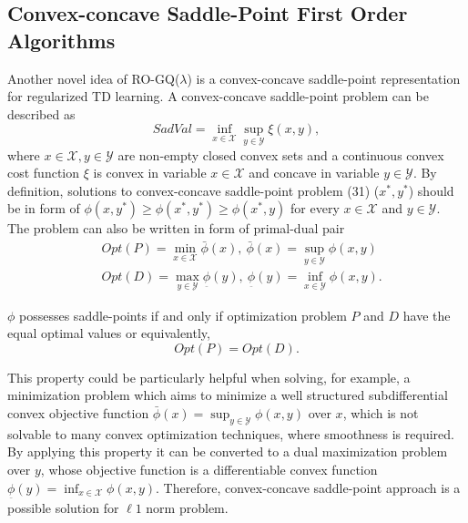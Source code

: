 \documentclass[conference]{IEEEtran}
\begin{document}
\subsection{Convex-concave Saddle-Point First Order Algorithms}
Another novel idea of RO-GQ($\lambda$) is a convex-concave saddle-point representation for regularized TD learning. A convex-concave saddle-point problem can be described as \cite{sra2012optimization}
\begin{equation}
	SadVal=\inf_{x\in\mathcal{X}}\sup_{y\in\mathcal{{Y}}}\xi(x,y),
\end{equation}
where $x\in\mathcal{X}, y\in\mathcal{Y}$ are non-empty closed convex sets and a continuous convex cost function $\xi$ is convex in variable $x\in\mathcal{X}$ and concave in variable $y\in\mathcal{Y}$. By definition, solutions to convex-concave saddle-point problem (31) ($x^*,y^*$) should be in form of $\phi(x, y^*)\geq\phi(x^*, y^*)\geq\phi(x^*, y)$ for every $x\in\mathcal{X}$ and $y\in\mathcal{Y}$. The problem can also be written in form of primal-dual pair 
\begin{equation}
  \begin{split}
    &Opt(P)=\min_{x\in\mathcal{X}}\bar{\phi}(x),\ \bar{\phi}(x)=\sup_{y\in\mathcal{Y}}\phi(x, y)\\
    &Opt(D)=\max_{y\in\mathcal{Y}}\underset{\bar{}}{\phi}(y),\ \underset{\bar{}}{\phi}(y)=\inf_{x\in\mathcal{Y}}\phi(x, y).
  \end{split}
\end{equation}

$\phi$ possesses saddle-points if and only if optimization problem $P$ and $D$ have the equal optimal values or equivalently,
\begin{equation}
  Opt(P) = Opt(D).
\end{equation}

This property could be particularly helpful when solving, for example, a minimization problem which aims to minimize a well structured subdifferential convex objective function $\bar{\phi}(x) = \sup_{y\in\mathcal{Y}}\phi(x, y)$ over $x$, which is not solvable to many convex optimization techniques, where smoothness is required. By applying this property it can be converted to a dual maximization problem over $y$, whose objective function is a differentiable convex function $\underset{\bar{}}{\phi}(y)=\inf_{x\in\mathcal{X}}\phi(x, y)$. Therefore, convex-concave saddle-point approach is a possible solution for $\ell1$ norm problem.
\end{document}
